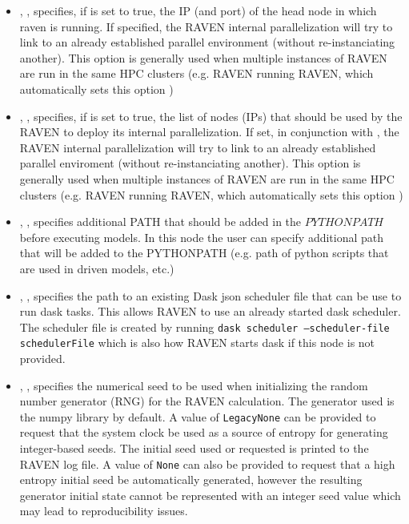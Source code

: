 \begin{itemize}
\item {}, , specifies, if  is set to true, the IP (and port) of the head node
in which raven is running. If specified, the RAVEN internal parallelization will try to link
to an already established parallel environment (without re-instanciating another).
\nb This option is generally used when multiple instances of RAVEN are run in the same HPC clusters (e.g. RAVEN running RAVEN, which
automatically sets this option )
%

\item {}, , specifies, if  is set to true, the list of nodes (IPs) that should be used by the RAVEN to deploy its internal parallelization.
If set, in conjunction with  ,  the RAVEN internal parallelization will try to link
to an already established parallel enviroment (without re-instanciating another).
\nb This option is generally used when multiple instances of RAVEN are run in the same HPC clusters (e.g. RAVEN running RAVEN, which
automatically sets this option )
%


\item {}, , specifies additional PATH that should be added in the $PYTHONPATH$ before executing models. In this node the user can specify
additional path that will be added to the PYTHONPATH (e.g. path of python scripts that are used in driven models, etc.)
%

\item {}, , specifies the path to an existing Dask json scheduler file that can be use to run dask tasks.  This allows RAVEN to use an already started dask scheduler.  The scheduler file is created by running \texttt{dask scheduler --scheduler-file schedulerFile} which is also how RAVEN starts dask if this node is not provided.

\item {}, , specifies the numerical seed to be used when initializing the random number
generator (RNG) for the RAVEN calculation. The generator used is the numpy library by default. A value of \texttt{LegacyNone} can be
provided to request that the system clock be used as a source of entropy for generating integer-based seeds. The initial seed used or requested
is printed to the RAVEN log file. A value of \texttt{None} can also be provided to request that a high entropy initial seed be automatically generated,
however the resulting generator initial state cannot be represented with an integer seed value which may lead to reproducibility issues.
%

\end{itemize}
